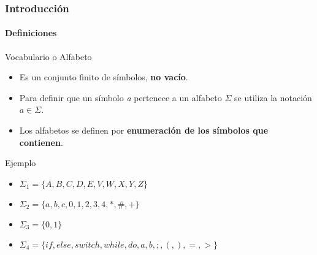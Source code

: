 \documentclass{beamer}
\begin{document}
        \begin{frame}
            \frametitle{Introducci\'on}
            \framesubtitle{Definiciones}

            \begin{block}{Vocabulario o Alfabeto}
                \begin{itemize}
                    \item[\checkmark] Es un conjunto finito de s\'imbolos, \textbf{no vac\'io}.
                    \item[\checkmark] Para definir que un s\'imbolo \emph{a} pertenece a un alfabeto $\Sigma$ se utiliza la notaci\'on $a \in \Sigma$.
                    \item[\checkmark] Los alfabetos se definen por \textbf{enumeraci\'on de los s\'imbolos que contienen}.
                \end{itemize}
            \end{block}
            \begin{exampleblock}{Ejemplo}
                \begin{itemize}
                    \item[\checkmark] $\Sigma_{1} = \{A , B , C , D , E, V, W , X , Y , Z\}$
                    \item[\checkmark] $\Sigma_{2} = \{a , b , c , 0 , 1 , 2 , 3 , 4 , * , \# , + \}$
                    \item[\checkmark] $\Sigma_{3} = \{0 , 1\}$
                    \item[\checkmark] $\Sigma_{4} = \{if, else, switch, while, do, a, b, ;, (, ), =, >\}$
                \end{itemize}
			\end{exampleblock}
		\end{frame}
\end{document}
